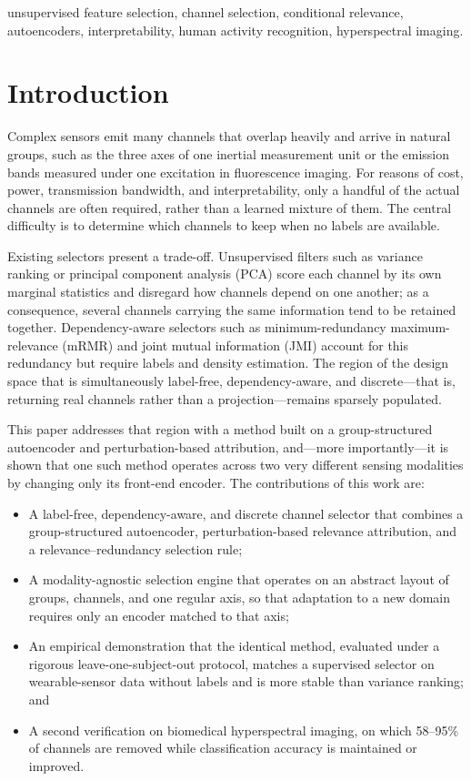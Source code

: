 \documentclass[conference]{IEEEtran}
\begin{document}
\begin{IEEEkeywords}
unsupervised feature selection, channel selection, conditional relevance,
autoencoders, interpretability, human activity recognition, hyperspectral imaging.
\end{IEEEkeywords}

\section{Introduction}
Complex sensors emit many channels that overlap heavily and arrive in natural
groups, such as the three axes of one inertial measurement unit or the emission
bands measured under one excitation in fluorescence imaging. For reasons of cost,
power, transmission bandwidth, and interpretability, only a handful of the actual
channels are often required, rather than a learned mixture of them. The central
difficulty is to determine which channels to keep when no labels are available.

Existing selectors present a trade-off. Unsupervised filters such as variance
ranking or principal component analysis (PCA) score each channel by its own
marginal statistics and disregard how channels depend on one another; as a
consequence, several channels carrying the same information tend to be retained
together. Dependency-aware selectors such as minimum-redundancy
maximum-relevance (mRMR) and joint mutual information (JMI) account for this
redundancy but require labels and density estimation. The region of the design
space that is simultaneously label-free, dependency-aware, and discrete---that
is, returning real channels rather than a projection---remains sparsely
populated.

This paper addresses that region with a method built on a group-structured
autoencoder and perturbation-based attribution, and---more importantly---it is
shown that one such method operates across two very different sensing modalities
by changing only its front-end encoder. The contributions of this work are:
\begin{itemize}
\item A label-free, dependency-aware, and discrete channel selector that combines
a group-structured autoencoder, perturbation-based relevance attribution, and a
relevance--redundancy selection rule;
\item A modality-agnostic selection engine that operates on an abstract layout of
groups, channels, and one regular axis, so that adaptation to a new domain
requires only an encoder matched to that axis;
\item An empirical demonstration that the identical method, evaluated under a
rigorous leave-one-subject-out protocol, matches a supervised selector on
wearable-sensor data without labels and is more stable than variance ranking; and
\item A second verification on biomedical hyperspectral imaging, on which
58--95\% of channels are removed while classification accuracy is maintained or
improved.
\end{itemize}
\end{document}
